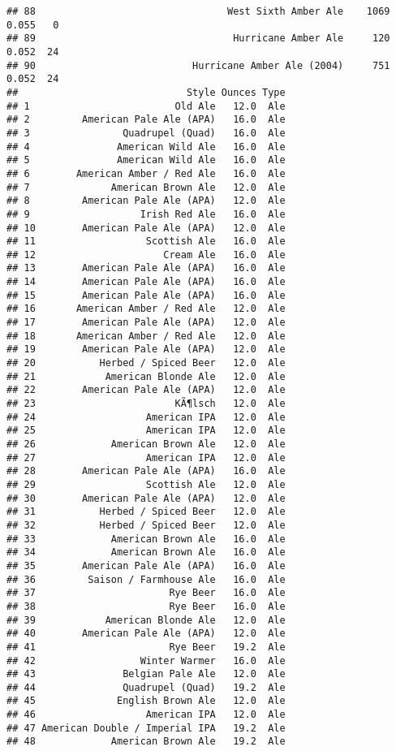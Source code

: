 \documentclass[
]{article}
\begin{document}
\begin{verbatim}
## 88                                 West Sixth Amber Ale    1069 0.055   0
## 89                                  Hurricane Amber Ale     120 0.052  24
## 90                           Hurricane Amber Ale (2004)     751 0.052  24
##                             Style Ounces Type
## 1                         Old Ale   12.0  Ale
## 2         American Pale Ale (APA)   16.0  Ale
## 3                Quadrupel (Quad)   16.0  Ale
## 4               American Wild Ale   16.0  Ale
## 5               American Wild Ale   16.0  Ale
## 6        American Amber / Red Ale   16.0  Ale
## 7              American Brown Ale   12.0  Ale
## 8         American Pale Ale (APA)   12.0  Ale
## 9                   Irish Red Ale   16.0  Ale
## 10        American Pale Ale (APA)   12.0  Ale
## 11                   Scottish Ale   16.0  Ale
## 12                      Cream Ale   16.0  Ale
## 13        American Pale Ale (APA)   16.0  Ale
## 14        American Pale Ale (APA)   16.0  Ale
## 15        American Pale Ale (APA)   16.0  Ale
## 16       American Amber / Red Ale   12.0  Ale
## 17        American Pale Ale (APA)   12.0  Ale
## 18       American Amber / Red Ale   12.0  Ale
## 19        American Pale Ale (APA)   12.0  Ale
## 20           Herbed / Spiced Beer   12.0  Ale
## 21            American Blonde Ale   12.0  Ale
## 22        American Pale Ale (APA)   12.0  Ale
## 23                        KÃ¶lsch   12.0  Ale
## 24                   American IPA   12.0  Ale
## 25                   American IPA   12.0  Ale
## 26             American Brown Ale   12.0  Ale
## 27                   American IPA   12.0  Ale
## 28        American Pale Ale (APA)   16.0  Ale
## 29                   Scottish Ale   12.0  Ale
## 30        American Pale Ale (APA)   12.0  Ale
## 31           Herbed / Spiced Beer   12.0  Ale
## 32           Herbed / Spiced Beer   12.0  Ale
## 33             American Brown Ale   16.0  Ale
## 34             American Brown Ale   16.0  Ale
## 35        American Pale Ale (APA)   16.0  Ale
## 36         Saison / Farmhouse Ale   16.0  Ale
## 37                       Rye Beer   16.0  Ale
## 38                       Rye Beer   16.0  Ale
## 39            American Blonde Ale   12.0  Ale
## 40        American Pale Ale (APA)   12.0  Ale
## 41                       Rye Beer   19.2  Ale
## 42                  Winter Warmer   16.0  Ale
## 43               Belgian Pale Ale   12.0  Ale
## 44               Quadrupel (Quad)   19.2  Ale
## 45              English Brown Ale   12.0  Ale
## 46                   American IPA   12.0  Ale
## 47 American Double / Imperial IPA   19.2  Ale
## 48             American Brown Ale   19.2  Ale

\end{verbatim}
\end{document}
